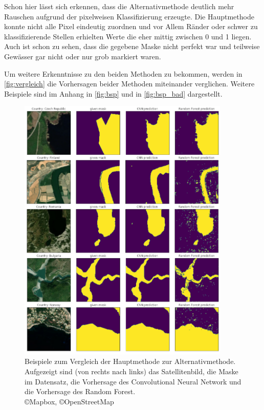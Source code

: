 Schon hier lässt sich erkennen, dass die Alternativmethode deutlich mehr Rauschen aufgrund der pixelweisen Klassifizierung erzeugte.
Die Hauptmethode konnte nicht alle Pixel eindeutig zuordnen und vor Allem Ränder oder schwer zu klassifizierende Stellen erhielten Werte die eher mittig zwischen 0 und 1 liegen.
Auch ist schon zu sehen, dass die gegebene Maske nicht perfekt war und teilweise Gewässer gar nicht oder nur grob markiert waren.

Um weitere Erkenntnisse zu den beiden Methoden zu bekommen, werden in \autoref{fig:vergleich} die Vorhersagen beider Methoden miteinander verglichen.
Weitere Beispiele sind im Anhang in \autoref{fig:bsp} und in \autoref{fig:bsp_bad} dargestellt.

\begin{figure}
    \centering
    \includegraphics[width=0.9\textwidth]{images/vergleich.png}
    \caption{Beispiele zum Vergleich der Hauptmethode zur Alternativmethode. %
    Aufgezeigt sind (von rechts nach links) das Satellitenbild, die Maske im Datensatz, die Vorhersage des Convolutional Neural Network und die Vorhersage des Random Forest.%
    \\ \copyright Mapbox, \copyright OpenStreetMap}
    \label{fig:vergleich}
\end{figure}

